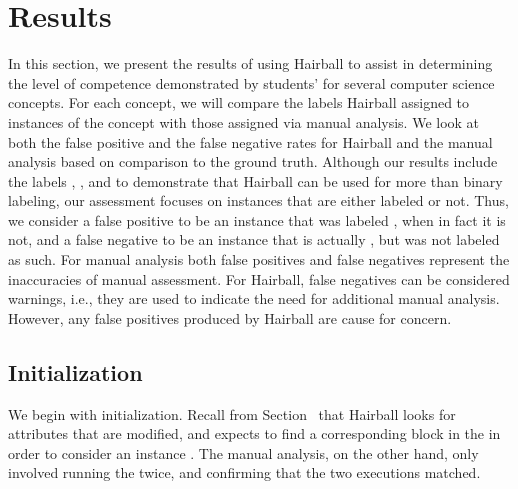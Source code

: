\section{Results}

In this section, we present the results of using Hairball to assist in
determining the level of competence demonstrated by students'  for
several computer science concepts. For each concept, we will compare the labels
Hairball assigned to instances of the concept with those assigned via manual
analysis. We look at both the false positive and the false negative rates for
Hairball and the manual analysis based on comparison to the ground
truth. Although our results include the labels \semincor{}, \incor{}, and
\incom{} to demonstrate that Hairball can be used for more than binary
labeling, our assessment focuses on instances that are either labeled
\correct{} or not. Thus, we consider a false positive to be an instance that
was labeled \correct{}, when in fact it is not, and a false negative to be an
instance that is actually \correct{}, but was not labeled as such. For manual
analysis both false positives and false negatives represent the inaccuracies of
manual assessment. For Hairball, false negatives can be considered warnings,
i.e., they are used to indicate the need for additional manual
analysis. However, any false positives produced by Hairball are cause for
concern.

\subsection{Initialization}
We begin with initialization. Recall from Section~ that
Hairball looks for attributes that are modified, and expects to find a
corresponding \abs{} block in the \initzone{} in order to consider an instance
\correct{}. The manual analysis, on the other hand, only involved running the
\sprogram{} twice, and confirming that the two executions matched.

